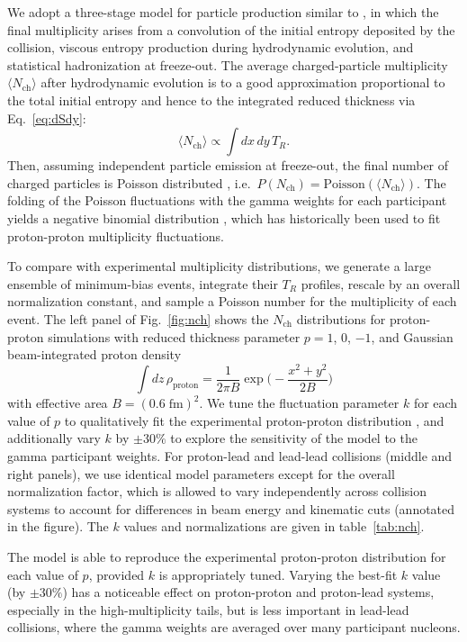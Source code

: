 \documentclass[aps,prc,reprint,amsmath,noeprint]{revtex4-1}
\newcommand{\avg}[1]{\langle #1 \rangle}
\newcommand{\nch}{N_\text{ch}}
\begin{document}
We adopt a three-stage model for particle production similar to \cite{Bozek:2013uha}, in which the final multiplicity arises from a convolution of the initial entropy deposited by the collision, viscous entropy production during hydrodynamic evolution, and statistical hadronization at freeze-out.
The average charged-particle multiplicity $\avg\nch$ after hydrodynamic evolution is to a good approximation proportional to the total initial entropy \cite{Song:2008si} and hence to the integrated reduced thickness via Eq.~\eqref{eq:dSdy}:
\begin{equation}
  \avg\nch \propto \int dx \, dy \, T_R.
\end{equation}
Then, assuming independent particle emission at freeze-out, the final number of charged particles is Poisson distributed \cite{Kisiel:2005hn,*Chojnacki:2011hb}, i.e.~$P(\nch) = \text{Poisson}(\avg\nch)$.
The folding of the Poisson fluctuations with the gamma weights for each participant yields a negative binomial distribution \cite{Bozek:2013uha}, which has historically been used to fit proton-proton multiplicity fluctuations.

To compare with experimental multiplicity distributions, we generate a large ensemble of minimum-bias events, integrate their $T_R$ profiles, rescale by an overall normalization constant, and sample a Poisson number for the multiplicity of each event.
The left panel of Fig.~\ref{fig:nch} shows the $\nch$ distributions for proton-proton simulations with reduced thickness parameter $p = 1$, 0, $-1$, and Gaussian beam-integrated proton density
\begin{equation}
  \int dz \, \rho_\text{proton} = \frac{1}{2\pi B} \exp\biggr( -\frac{x^2 + y^2}{2B} \biggr)
\end{equation}
with effective area $B = (0.6\;\text{fm})^2$.
We tune the fluctuation parameter $k$ for each value of $p$ to qualitatively fit the experimental proton-proton distribution \cite{Aamodt:2010ft}, and additionally vary $k$ by $\pm30\%$ to explore the sensitivity of the model to the gamma participant weights.
For proton-lead and lead-lead collisions \cite{Abelev:2014mda} (middle and right panels), we use identical model parameters except for the overall normalization factor, which is allowed to vary independently across collision systems to account for differences in beam energy and kinematic cuts (annotated in the figure).
The $k$ values and normalizations are given in table~\ref{tab:nch}.

The model is able to reproduce the experimental proton-proton distribution for each value of $p$, provided $k$ is appropriately tuned.
Varying the best-fit $k$ value (by $\pm30\%$) has a noticeable effect on proton-proton and proton-lead systems, especially in the high-multiplicity tails, but is less important in lead-lead collisions, where the gamma weights are averaged over many participant nucleons.
\end{document}

